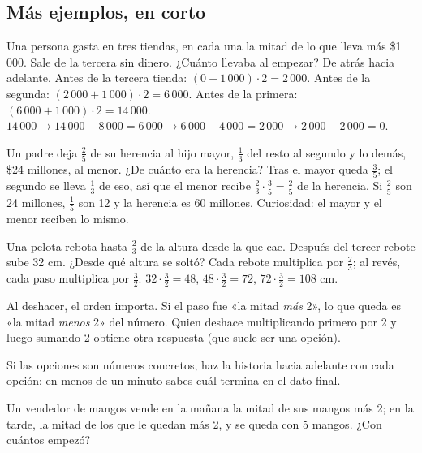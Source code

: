 \subsection{Más ejemplos, en corto}
\begin{ejemplo}
Una persona gasta en tres tiendas, en cada una la mitad de lo que lleva más \$1\,000. Sale de la tercera sin dinero.
¿Cuánto llevaba al empezar?
\solucion De atrás hacia adelante. Antes de la tercera tienda: $(0 + 1\,000)\cdot 2 = 2\,000$. Antes de la segunda:
$(2\,000 + 1\,000)\cdot 2 = 6\,000$. Antes de la primera: $(6\,000 + 1\,000)\cdot 2 = 14\,000$.
 $14\,000 \to 14\,000 - 8\,000 = 6\,000 \to 6\,000 - 4\,000 = 2\,000 \to 2\,000 - 2\,000 = 0$.
\end{ejemplo}

\begin{ejemplo}[La herencia]
Un padre deja $\tfrac25$ de su herencia al hijo mayor, $\tfrac13$ del resto al segundo y lo demás, \$24 millones, al
menor. ¿De cuánto era la herencia?
\solucion Tras el mayor queda $\tfrac35$; el segundo se lleva $\tfrac13$ de eso, así que el menor recibe
$\tfrac23 \cdot \tfrac35 = \tfrac25$ de la herencia. Si $\tfrac25$ son 24 millones, $\tfrac15$ son 12 y la herencia
es 60 millones. Curiosidad: el mayor y el menor reciben lo mismo.
\end{ejemplo}

\begin{ejemplo}[El rebote]
Una pelota rebota hasta $\tfrac23$ de la altura desde la que cae. Después del tercer rebote sube 32 cm. ¿Desde qué
altura se soltó?
\solucion Cada rebote multiplica por $\tfrac23$; al revés, cada paso multiplica por $\tfrac32$:
$32 \cdot \tfrac32 = 48$, $48 \cdot \tfrac32 = 72$, $72 \cdot \tfrac32 = 108$ cm.
\end{ejemplo}

\begin{trampa}
Al deshacer, el orden importa. Si el paso fue «la mitad \emph{más} 2», lo que queda es «la mitad \emph{menos} 2» del
número. Quien deshace multiplicando primero por 2 y luego sumando 2 obtiene otra respuesta (que suele ser una opción).
\end{trampa}

\begin{atajo}
Si las opciones son números concretos, haz la historia hacia adelante con cada opción: en menos de un minuto sabes cuál
termina en el dato final.
\end{atajo}

\begin{reto}
Un vendedor de mangos vende en la mañana la mitad de sus mangos más 2; en la tarde, la mitad de los que le quedan más 2,
y se queda con 5 mangos. ¿Con cuántos empezó?
\end{reto}

